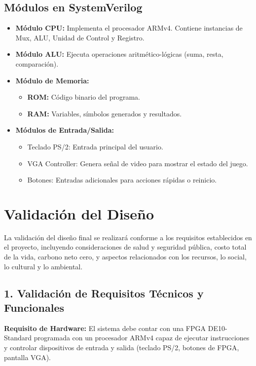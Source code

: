 \documentclass[conference]{IEEEtran}
\begin{document}
\subsection*{Módulos en SystemVerilog}

\begin{itemize}
	\item \textbf{Módulo CPU:} Implementa el procesador ARMv4. Contiene instancias de Mux, ALU, Unidad de Control y Registro.
	\item \textbf{Módulo ALU:} Ejecuta operaciones aritmético-lógicas (suma, resta, comparación).
	\item \textbf{Módulo de Memoria:}
	\begin{itemize}
		\item \textbf{ROM:} Código binario del programa.
		\item \textbf{RAM:} Variables, símbolos generados y resultados.
	\end{itemize}
	\item \textbf{Módulos de Entrada/Salida:}
	\begin{itemize}
		\item Teclado PS/2: Entrada principal del usuario.
		\item VGA Controller: Genera señal de video para mostrar el estado del juego.
		\item Botones: Entradas adicionales para acciones rápidas o reinicio.
	\end{itemize}
\end{itemize}


\section{Validación del Diseño}

La validación del diseño final se realizará conforme a los requisitos establecidos en el proyecto, incluyendo consideraciones de salud y seguridad pública, costo total de la vida, carbono neto cero, y aspectos relacionados con los recursos, lo social, lo cultural y lo ambiental.

\subsection*{1. Validación de Requisitos Técnicos y Funcionales}

\textbf{Requisito de Hardware:} El sistema debe contar con una FPGA DE10-Standard programada con un procesador ARMv4 capaz de ejecutar instrucciones y controlar dispositivos de entrada y salida (teclado PS/2, botones de FPGA, pantalla VGA).
\end{document}
